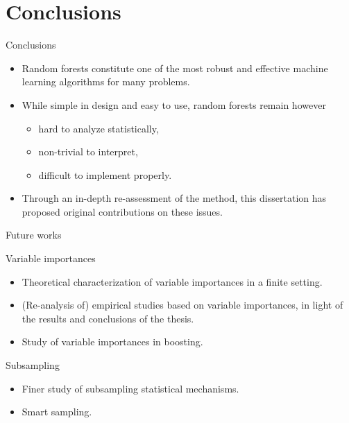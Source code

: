 \documentclass{beamer}
\begin{document}

\section{Conclusions}

\begin{frame}{Conclusions}
\begin{itemize}

\item Random forests constitute one of the most {\color{blue} robust and
effective} machine learning algorithms for many problems.

\item While simple in design and easy to use, random forests remain however
  \begin{itemize}
    \item hard to analyze statistically,
    \item non-trivial to interpret,
    \item difficult to implement properly.
  \end{itemize}

\item Through an in-depth re-assessment of the method, this dissertation has
proposed {\color{blue} original contributions} on these issues.

\end{itemize}
\end{frame}

\begin{frame}{Future works}

\begin{block}{Variable importances}
\begin{itemize}
\item Theoretical characterization of variable importances in a finite setting.
\item (Re-analysis of) empirical studies based on variable importances, in light
of the results and conclusions of the thesis.
\item Study of variable importances in boosting.
\end{itemize}
\end{block}

\begin{block}{Subsampling}
\begin{itemize}
\item Finer study of subsampling statistical mechanisms.
\item Smart sampling.
\end{itemize}
\end{block}

\end{frame}
\end{document}
